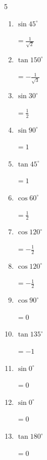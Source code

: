 \begin{multicols}{5}
\begin{enumerate}
        $\displaystyle =1$

\columnbreak %

  \item $\displaystyle \sin{45^\circ}$

        $\displaystyle =\frac{1}{\sqrt{2}}$

  \item $\displaystyle \tan{150^\circ}$

        $\displaystyle =-\frac{1}{\sqrt{3}}$

  \item $\displaystyle \sin{30^\circ}$

        $\displaystyle =\frac{1}{2}$

  \item $\displaystyle \sin{90^\circ}$

        $\displaystyle =1$

  \item $\displaystyle \tan{45^\circ}$

        $\displaystyle =1$

  \item $\displaystyle \cos{60^\circ}$

        $\displaystyle =\frac{1}{2}$

  \item $\displaystyle \cos{120^\circ}$

        $\displaystyle =-\frac{1}{2}$

  \item $\displaystyle \cos{120^\circ}$

        $\displaystyle =-\frac{1}{2}$

  \item $\displaystyle \cos{90^\circ}$

        $\displaystyle =0$

  \item $\displaystyle \tan{135^\circ}$

        $\displaystyle =-1$

  \item $\displaystyle \sin{0^\circ}$

        $\displaystyle =0$

  \item $\displaystyle \sin{0^\circ}$

        $\displaystyle =0$

  \item $\displaystyle \tan{180^\circ}$

        $\displaystyle =0$


\end{enumerate}
\end{multicols}
